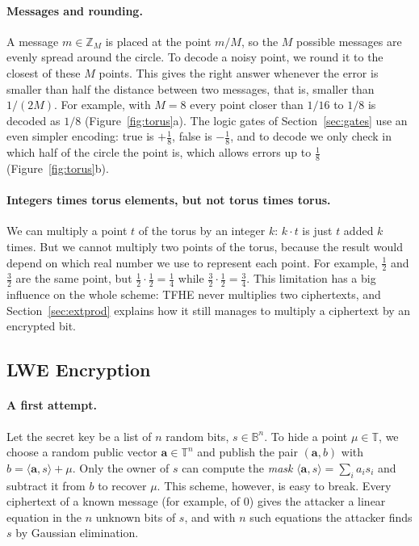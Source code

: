 \documentclass[12pt]{article}
\theoremstyle{plain}
\theoremstyle{definition}
\newcommand{\T}{\mathbb{T}}
\newcommand{\Z}{\mathbb{Z}}
\newcommand{\B}{\mathbb{B}}
\begin{document}
\paragraph{Messages and rounding.}
A message $m\in\Z_M$ is placed at the point $m/M$, so the $M$ possible messages
are evenly spread around the circle. To decode a noisy point, we round it to
the closest of these $M$ points. This gives the right answer whenever the error
is smaller than half the distance between two messages, that is, smaller than
$1/(2M)$. For example, with $M=8$ every point closer than $1/16$ to $1/8$ is
decoded as $1/8$ (Figure~\ref{fig:torus}a). The logic gates of
Section~\ref{sec:gates} use an even simpler encoding: \textsf{true} is
$+\frac18$, \textsf{false} is $-\frac18$, and to decode we only check in which
half of the circle the point is, which allows errors up to $\frac18$
(Figure~\ref{fig:torus}b).



\paragraph{Integers times torus elements, but not torus times torus.}
We can multiply a point $t$ of the torus by an integer $k$: $k\cdot t$ is just
$t$ added $k$ times. But we cannot multiply two points of the torus, because the
result would depend on which real number we use to represent each point. For
example, $\frac12$ and $\frac32$ are the same point, but
$\frac12\cdot\frac12=\frac14$ while $\frac32\cdot\frac12=\frac34$. This limitation
has a big influence on the whole scheme: TFHE never multiplies two ciphertexts,
and Section~\ref{sec:extprod} explains how it still manages to multiply a
ciphertext by an encrypted bit.

\subsection{LWE Encryption}
\label{sec:lwe}

\paragraph{A first attempt.}
Let the secret key be a list of $n$ random bits, $s\in\B^n$. To hide a point
$\mu\in\T$, we choose a random public vector $\mathbf a\in\T^n$ and publish the
pair $(\mathbf a,b)$ with $b=\langle\mathbf a,s\rangle+\mu$. Only the owner of
$s$ can compute the \emph{mask} $\langle\mathbf a,s\rangle=\sum_ia_is_i$ and
subtract it from $b$ to recover $\mu$. This scheme, however, is easy to break.
Every ciphertext of a known message (for example, of $0$) gives the attacker a
linear equation in the $n$ unknown bits of $s$, and with $n$ such equations the
attacker finds $s$ by Gaussian elimination.
\end{document}
